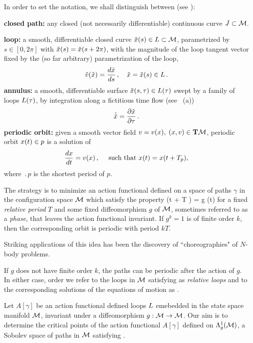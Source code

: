     In order to set the notation, we shall distinguish between (see ):

\medskip
\noindent
 {\bf closed path:}
 any closed (not necessarily differentiable) continuous curve 
$J \subset {\cal M}$.

\medskip
\noindent
{\bf loop:}
 a smooth, differentiable closed curve $\tilde{x}(s)\in L \subset 
{\cal M}$, 
parametrized by $s \in [0,2\pi]$ with $\tilde{x}(s)=\tilde{x}(s+2\pi)$, with the
magnitude of the loop tangent vector fixed by 
the (so far arbitrary) parametrization of the loop,
\[
\tilde{v}(\tilde{x})=\frac{d \tilde{x}}{ds}\,, \quad \tilde{x}=\tilde{x}(s) \in L
\,.
\]   
{\bf annulus:} 
 a smooth, differentiable surface $\tilde{x}(s,\tau)\in L(\tau)$ swept by a 
family of loops $L(\tau)$, by integration along a fictitious time flow
(see ~(a))
\[
\dot{\tilde{x}}=\frac{\partial \tilde{x}}{\partial \tau}
\,.
\]
{\bf periodic orbit:}
 given a smooth vector field $v=v(x),\; (x,v) \in {\bf T} {\cal M}$, periodic orbit $x(t) \in p$ is a solution of
\[
\frac{dx}{dt}=v(x) 
	\,,\quad
	\mbox{ such that } x(t)=x(t+{T_{p}}),
\] 
where $\period{p}$ is the shortest period of $p$.



The strategy
is to minimize an action functional defined on a space of paths $\gamma$ in the
configuration space ${\cal M}$ which satisfy the property
\beq
                               \gamma (t + T ) = g \cdot \gamma (t)                       
\label{McC1}
\eeq
for a fixed {\em relative period} $T$ and some fixed diffeomorphism $g$ of ${\cal M}$, 
sometimes referred to as a {\em phase}, that leaves the 
action functional invariant. If $g^k=1$ is of finite order
$k$, then the corresponding orbit is periodic with period $k T$. 

Striking applications of this idea has been the discovery
of ``choreographies" of $N$-body problems.

If $g$ does not have finite order $k$, the
paths can be periodic after the action of $g$. 
In either case, order we refer to the loops
in ${\cal M}$ satisfying  as 
{\em relative loops} and
to the corresponding solutions of the equations of motion
as {\em \rpo}. 

    Let $A[\gamma]$ be an action functional defined loops $L$
emebedded in the state space manifold ${\cal M}$, invariant
under a diffeomorphism $g : {\cal M} \to{\cal M}$. Our aim is to determine
the critical points of the action functional
$ %
	A[\gamma]
$ %
defined on $\Lambda_g^1({\cal M})$, a Sobolev space of paths in ${\cal M}$ satisfying 
.


